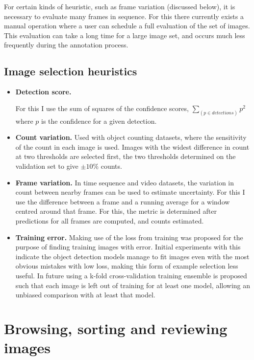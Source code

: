 For certain kinds of heuristic, such as frame variation (discussed below), it is necessary to evaluate many frames in sequence. For this there currently exists a manual operation where a user can schedule a full evaluation of the set of images. This evaluation can take a long time for a large image set, and occurs much less frequently during the annotation process.


\subsection {Image selection heuristics}
\begin{itemize}
\item {\bf Detection score. }

For this I use the sum of squares of the confidence scores, $ \sum_(p \in detections){ p^2 } $ where $p$ is the confidence for a given detection. 

    \item {\bf Count variation. }
Used with object counting datasets, where the sensitivity of the count in each image is used. Images with the widest difference in count at two thresholds are selected first, the two thresholds determined on the validation set to give $ \pm 10\% $ counts.
    \item {\bf Frame variation. } 
In time sequence and video datasets, the variation in count between nearby frames can be used to estimate uncertainty. For this I use the difference between a frame and a running average for a window centred around that frame. For this, the metric is determined after predictions for all frames are computed, and counts estimated.
    \item {\bf Training error. }
Making use of the loss from training was proposed for the purpose of finding training images with error. Initial experiments with this indicate the object detection models manage to fit images even with the most obvious mistakes with low loss, making this form of example selection less useful. In future using a k-fold cross-validation training ensemble is proposed such that each image is left out of training for at least one model, allowing an unbiased comparison with at least that model.
\end{itemize}


\section{Browsing, sorting and reviewing images}
\label{sec:browising}



